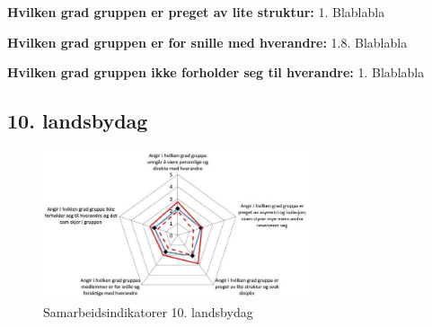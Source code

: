 \noindent \textbf{Hvilken grad gruppen er preget av lite struktur:} 1.
\newline
\noindent Blablabla
\vspace{\secspace}

\noindent \textbf{Hvilken grad gruppen er for snille med hverandre:} 1.8.
\newline
\noindent Blablabla
\vspace{\secspace}

\noindent \textbf{Hvilken grad gruppen ikke forholder seg til hverandre:} 1.
\newline
\noindent Blablabla

\subsection{10. landsbydag}
\begin{figure}[H]
    \centering
    \includegraphics[width=0.7\textwidth]{images/sam2.jpeg}	
    \caption{Samarbeidsindikatorer 10. landsbydag}
    \label{fig:sam2}
\end{figure}

